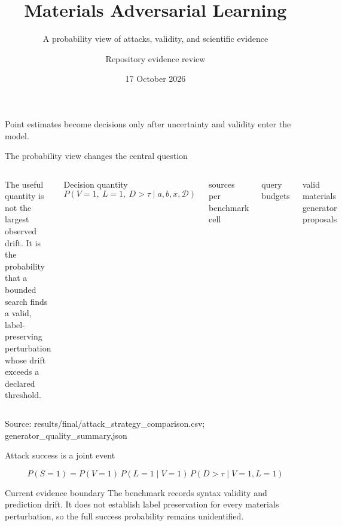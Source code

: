 \documentclass[aspectratio=169,10pt]{beamer}
\title{Materials Adversarial Learning}
\subtitle{A probability view of attacks, validity, and scientific evidence}
\author{Repository evidence review}
\date{17 October 2026}
\newcommand{\metric}[3]{\begin{block}{#2}\centering{\Huge\bfseries\color{#3}#1}\end{block}}
\newcommand{\smallsource}[1]{\vfill{\tiny\color{Muted}Source: #1}}
\begin{document}
\begin{frame}
  \titlepage
  \vspace{-1em}
  \centering\color{Amber}\large Point estimates become decisions only after uncertainty and validity enter the model.
\end{frame}

\begin{frame}{The probability view changes the central question}
\begin{columns}[T,totalwidth=\textwidth]
\Large
The useful quantity is not the largest observed drift. It is the probability that a bounded search finds a valid, label-preserving perturbation whose drift exceeds a declared threshold.

\vspace{1em}
\begin{block}{Decision quantity}
\[
P\!\left(V=1,\ L=1,\ D>\tau\mid a,b,x,\mathcal D\right)
\]
\end{block}
\metric{$n=30$}{sources per benchmark cell}{Cyan}
\metric{$b\in\{5,20,50\}$}{query budgets}{Amber}
\metric{0/22,500}{valid materials generator proposals}{Red}
\end{columns}
\smallsource{results/final/attack\_strategy\_comparison.csv; generator\_quality\_summary.json}
\end{frame}

\begin{frame}{Attack success is a joint event}
\centering
{}

\vspace{1.2em}
\[
P(S=1)=P(V=1)\,P(L=1\mid V=1)\,P(D>\tau\mid V=1,L=1)
\]

\begin{alertblock}{Current evidence boundary}
The benchmark records syntax validity and prediction drift. It does not establish label preservation for every materials perturbation, so the full success probability remains unidentified.
\end{alertblock}
\end{frame}
\end{document}
